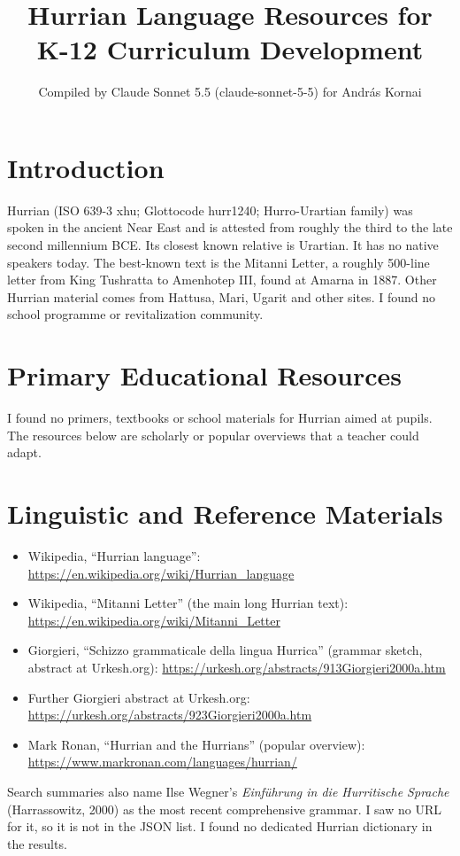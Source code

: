 \documentclass[12pt]{article}
\title{Hurrian Language Resources for K-12 Curriculum Development}
\author{Compiled by Claude Sonnet 5.5 (claude-sonnet-5-5) for Andr\'as Kornai}
\date{}
\begin{document}
\maketitle

\section{Introduction}
Hurrian (ISO 639-3 xhu; Glottocode hurr1240; Hurro-Urartian family) was spoken in the ancient Near East and is attested from roughly the third to the late second millennium BCE. Its closest known relative is Urartian. It has no native speakers today. The best-known text is the Mitanni Letter, a roughly 500-line letter from King Tushratta to Amenhotep III, found at Amarna in 1887. Other Hurrian material comes from Hattusa, Mari, Ugarit and other sites. I found no school programme or revitalization community.

\section{Primary Educational Resources}
I found no primers, textbooks or school materials for Hurrian aimed at pupils. The resources below are scholarly or popular overviews that a teacher could adapt.

\section{Linguistic and Reference Materials}
\begin{itemize}
\item Wikipedia, ``Hurrian language'': \url{https://en.wikipedia.org/wiki/Hurrian_language}
\item Wikipedia, ``Mitanni Letter'' (the main long Hurrian text): \url{https://en.wikipedia.org/wiki/Mitanni_Letter}
\item Giorgieri, ``Schizzo grammaticale della lingua Hurrica'' (grammar sketch, abstract at Urkesh.org): \url{https://urkesh.org/abstracts/913Giorgieri2000a.htm}
\item Further Giorgieri abstract at Urkesh.org: \url{https://urkesh.org/abstracts/923Giorgieri2000a.htm}
\item Mark Ronan, ``Hurrian and the Hurrians'' (popular overview): \url{https://www.markronan.com/languages/hurrian/}
\end{itemize}
Search summaries also name Ilse Wegner's \emph{Einf\"uhrung in die Hurritische Sprache} (Harrassowitz, 2000) as the most recent comprehensive grammar. I saw no URL for it, so it is not in the JSON list. I found no dedicated Hurrian dictionary in the results.
\end{document}
